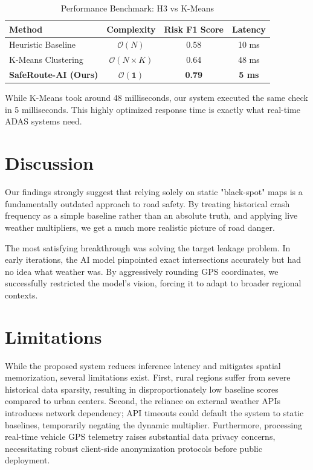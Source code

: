 \documentclass[conference]{IEEEtran}
\begin{document}
\begin{table}[htbp]
\caption{Performance Benchmark: H3 vs K-Means}
\begin{center}
\begin{tabular}{|l|c|c|c|}
\hline
\textbf{Method} & \textbf{Complexity} & \textbf{Risk F1 Score} & \textbf{Latency} \\
\hline
Heuristic Baseline & $\mathcal{O}(N)$ & 0.58 & 10 ms \\
\hline
K-Means Clustering & $\mathcal{O}(N \times K)$ & 0.64 & 48 ms \\
\hline
\textbf{SafeRoute-AI (Ours)} & $\mathbf{\mathcal{O}(1)}$ & \textbf{0.79} & \textbf{5 ms} \\
\hline
\end{tabular}
\end{center}
\end{table}

While K-Means took around 48 milliseconds, our system executed the same check in 5 milliseconds. This highly optimized response time is exactly what real-time ADAS systems need.

\section{Discussion}
Our findings strongly suggest that relying solely on static "black-spot" maps is a fundamentally outdated approach to road safety. By treating historical crash frequency as a simple baseline rather than an absolute truth, and applying live weather multipliers, we get a much more realistic picture of road danger. 

The most satisfying breakthrough was solving the target leakage problem. In early iterations, the AI model pinpointed exact intersections accurately but had no idea what weather was. By aggressively rounding GPS coordinates, we successfully restricted the model's vision, forcing it to adapt to broader regional contexts.


\section{Limitations}
While the proposed system reduces inference latency and mitigates spatial memorization, several limitations exist. First, rural regions suffer from severe historical data sparsity, resulting in disproportionately low baseline scores compared to urban centers. Second, the reliance on external weather APIs introduces network dependency; API timeouts could default the system to static baselines, temporarily negating the dynamic multiplier. Furthermore, processing real-time vehicle GPS telemetry raises substantial data privacy concerns, necessitating robust client-side anonymization protocols before public deployment.
\end{document}
